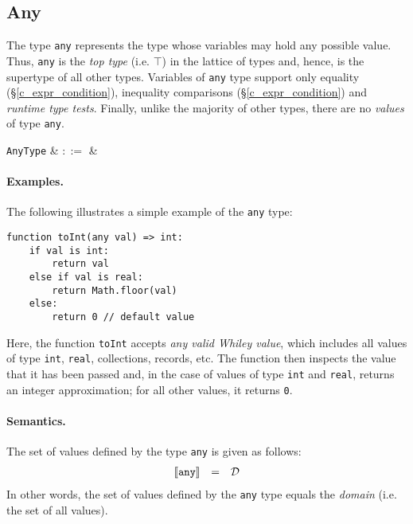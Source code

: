 
\subsection{Any}
\label{c_types_any}

The type \lstinline{any} represents the type whose variables may hold any possible value.  Thus, \lstinline{any} is the {\em top type} (i.e. $\top$) in the lattice of types and, hence, is the supertype of all other types.  Variables of \lstinline{any} type support only equality (\S\ref{c_expr_condition}), inequality comparisons (\S\ref{c_expr_condition}) and {\em runtime type tests}.  Finally, unlike the majority of other types, there are no {\em values} of type \lstinline{any}.

\begin{syntax}
  \verb+AnyType+ & $::=$ &  \\
\end{syntax}

\paragraph{Examples.}  The following illustrates a simple example of the \lstinline{any} type:

\begin{lstlisting}
function toInt(any val) => int:
    if val is int:
        return val
    else if val is real:
        return Math.floor(val)
    else:
        return 0 // default value        
\end{lstlisting}

Here, the function \lstinline{toInt} accepts {\em any valid Whiley value}, which includes all values of type \lstinline{int}, \lstinline{real}, collections, records, etc.  The function then inspects the value that it has been passed and, in the case of values of type \lstinline{int} and \lstinline{real}, returns an integer approximation; for all other values, it returns \lstinline{0}.

\paragraph{Semantics.}  The set of values defined by the type \lstinline{any} is given as follows:
\begin{displaymath}
\begin{array}{rcl}
{\tt\llbracket any\rrbracket} & = & \mathcal{D}\\
\end{array}
\end{displaymath}
In other words, the set of values defined by the \lstinline{any} type equals the {\em domain} (i.e. the set of all values).

